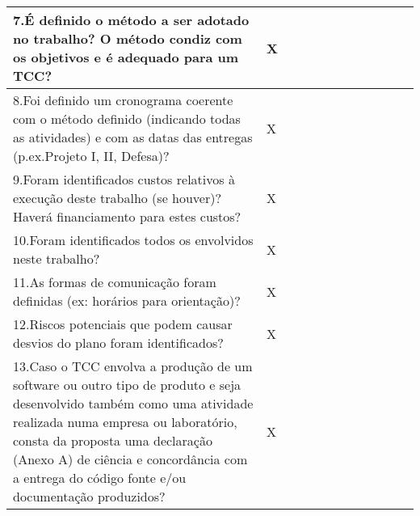 \begin{folhadeaprovacao}
{\begin{tabular}{|X p{6.5cm}|X p{0.7cm}|X p{1.5cm}|X p{0.7cm}|X p{1.5cm}|X p{5.2cm}|}
				{\small 7.É definido o método a ser adotado no trabalho? O método condiz com os objetivos e é adequado para um TCC? } & \cellcolor{shadecolor} X & \cellcolor{shadecolor}  & \cellcolor{shadecolor}  & \cellcolor{shadecolor}  & \\ \hline
				{\small 8.Foi definido um cronograma coerente com o método definido (indicando todas as atividades) e com as datas das entregas (p.ex.Projeto I, II, Defesa)?} & \cellcolor{shadecolor} X & \cellcolor{shadecolor}  & \cellcolor{shadecolor}  & \cellcolor{shadecolor}  & \\ \hline
				{\small 9.Foram identificados custos relativos à execução deste trabalho (se houver)? Haverá financiamento para estes custos?} & \cellcolor{shadecolor} X & \cellcolor{shadecolor}  & \cellcolor{shadecolor}  & \cellcolor{shadecolor}  & \\ \hline
				{\small 10.Foram identificados todos os envolvidos neste trabalho?} & \cellcolor{shadecolor} X & \cellcolor{shadecolor}  & \cellcolor{shadecolor}  & \cellcolor{shadecolor}  & \\ \hline
				{\small 11.As formas de comunicação foram definidas (ex: horários para orientação)?} & \cellcolor{shadecolor} X & \cellcolor{shadecolor}  & \cellcolor{shadecolor}  & \cellcolor{shadecolor}  & \\ \hline
				{\small 12.Riscos potenciais que podem causar desvios do plano foram identificados?} & \cellcolor{shadecolor} X & \cellcolor{shadecolor}  & \cellcolor{shadecolor}  & \cellcolor{shadecolor}  & \\ \hline
				{\small 13.Caso o TCC envolva a produção de um software ou outro tipo de produto e seja desenvolvido também como uma atividade	realizada numa empresa ou laboratório, consta da proposta uma declaração (Anexo A) de ciência e concordância com a entrega do código fonte e/ou documentação produzidos? } & \cellcolor{shadecolor} X & \cellcolor{shadecolor}  & \cellcolor{shadecolor}  & \cellcolor{shadecolor}  & \\ \hline

		\end{tabular}
	}

\vspace{5pt}

	\noindent{}
\end{folhadeaprovacao}

